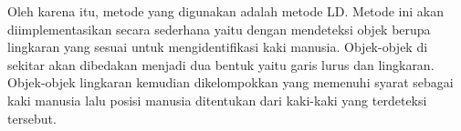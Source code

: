     Oleh karena itu, metode yang digunakan adalah metode LD.
    Metode ini akan diimplementasikan secara sederhana yaitu dengan mendeteksi objek berupa lingkaran yang sesuai untuk mengidentifikasi kaki manusia. Objek-objek di sekitar akan dibedakan menjadi dua bentuk yaitu garis lurus dan lingkaran. Objek-objek lingkaran kemudian dikelompokkan yang memenuhi syarat sebagai kaki manusia lalu posisi manusia ditentukan dari kaki-kaki yang terdeteksi tersebut.





